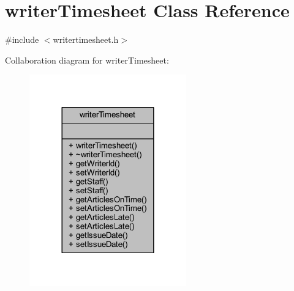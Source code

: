 \hypertarget{classwriter_timesheet}{}\section{writer\+Timesheet Class Reference}
\label{classwriter_timesheet}


{\ttfamily \#include $<$writertimesheet.\+h$>$}



Collaboration diagram for writer\+Timesheet\+:
\nopagebreak
\begin{figure}[H]
\begin{center}
\leavevmode
\includegraphics[width=192pt]{classwriter_timesheet__coll__graph}
\end{center}
\end{figure}
